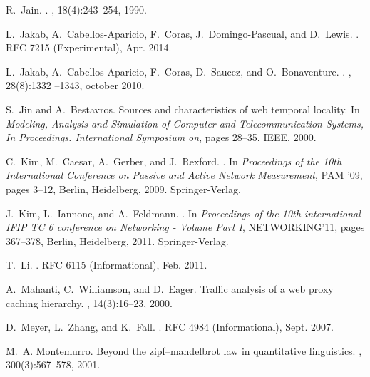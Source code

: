 \documentclass[twocolumn, 10pt]{article}
\theoremstyle{plain}
\begin{document}
\begin{thebibliography}{10}
R.~Jain.
.
, 18(4):243--254, 1990.

L.~Jakab, A.~Cabellos-Aparicio, F.~Coras, J.~Domingo-Pascual, and D.~Lewis.
.
\newblock RFC 7215 (Experimental), Apr. 2014.

L.~Jakab, A.~Cabellos-Aparicio, F.~Coras, D.~Saucez, and O.~Bonaventure.
.
, 28(8):1332
  --1343, october 2010.

S.~Jin and A.~Bestavros.
\newblock Sources and characteristics of web temporal locality.
\newblock In {\em Modeling, Analysis and Simulation of Computer and
  Telecommunication Systems, In Proceedings. International Symposium on}, pages
  28--35. IEEE, 2000.

C.~Kim, M.~Caesar, A.~Gerber, and J.~Rexford.
.
\newblock In {\em Proceedings of the 10th International Conference on Passive
  and Active Network Measurement}, PAM '09, pages 3--12, Berlin, Heidelberg,
  2009. Springer-Verlag.

J.~Kim, L.~Iannone, and A.~Feldmann.
.
\newblock In {\em Proceedings of the 10th international IFIP TC 6 conference on
  Networking - Volume Part I}, NETWORKING'11, pages 367--378, Berlin,
  Heidelberg, 2011. Springer-Verlag.

T.~Li.
.
\newblock RFC 6115 (Informational), Feb. 2011.

A.~Mahanti, C.~Williamson, and D.~Eager.
\newblock Traffic analysis of a web proxy caching hierarchy.
, 14(3):16--23, 2000.

D.~Meyer, L.~Zhang, and K.~Fall.
.
\newblock RFC 4984 (Informational), Sept. 2007.

M.~A. Montemurro.
\newblock Beyond the zipf--mandelbrot law in quantitative linguistics.
,
  300(3):567--578, 2001.


\end{thebibliography}
\end{document}
